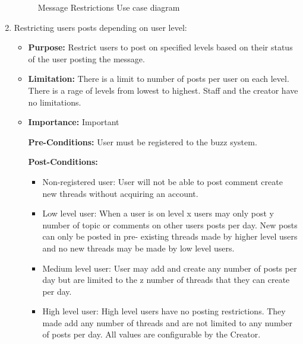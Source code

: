 \documentclass[11pt]{article}
\begin{document}
\begin{enumerate}
\begin{figure}[H]
    	\caption{Message Restrictions Use case diagram}
	\end{figure}
































\item  Restricting users posts depending on user level:
\begin{itemize}	
		\item
		\textbf{Purpose:}
		\newline
		Restrict users to post on specified levels based on their status of the user posting the message.
		\item\textbf{Limitation: }
		\newline
		 There is a limit to number of posts per user on each level.
		 There is a rage of levels from lowest to highest.
		 Staff and the creator have no limitations.
		\item\textbf{Importance:} 
		\newline Important

		\textbf{Pre-Conditions: }
		\newline
		 User must be registered to the buzz system.
	
		\textbf{Post-Conditions: }
		\begin{itemize}
			\item Non-registered user:
			User will not be able to post comment create new threads without acquiring an account.
			\item Low level user:
			When a user is on level x users may only post y number of topic or comments on other users posts per day. New posts can only be posted in pre-		existing threads made by higher level users and no new threads may be made by low level users. 
			\item Medium level user:
			User may add and create any number of posts per day but are limited to the z number of threads that they can create per day.
			\item High level user:
			High level users have no posting restrictions. They made add any number of threads and are not limited to any number of posts per day.
		 	All values are configurable by the Creator.
		 \end{itemize}


\end{itemize}
\end{enumerate}
\end{document}
